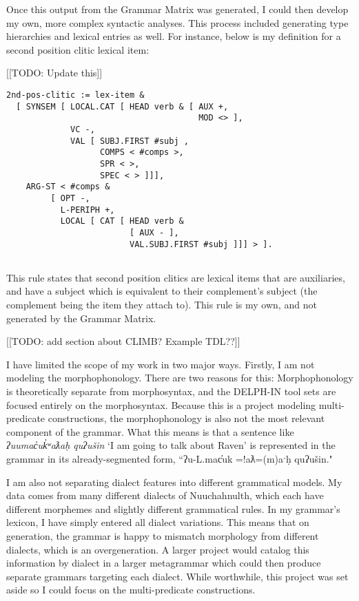 Once this output from the Grammar Matrix was generated, I could then develop my own, more complex syntactic analyses. This process included generating type hierarchies and lexical entries as well. For instance, below is my definition for a second position clitic lexical item:

[[TODO: Update this]]

\begin{verbatim}
2nd-pos-clitic := lex-item &
  [ SYNSEM [ LOCAL.CAT [ HEAD verb & [ AUX +,
				                       MOD <> ],
             VC -,
             VAL [ SUBJ.FIRST #subj ,
                   COMPS < #comps >,
                   SPR < >,
                   SPEC < > ]]],
    ARG-ST < #comps &
         [ OPT -,
           L-PERIPH +,
           LOCAL [ CAT [ HEAD verb &
                         [ AUX - ],
                         VAL.SUBJ.FIRST #subj ]]] > ].
	
\end{verbatim}

\noindent This rule states that second position clitics are lexical items that are auxiliaries, and have a subject which is equivalent to their complement's subject (the complement being the item they attach to). This rule is my own, and not generated by the Grammar Matrix.

[[TODO: add section about CLIMB? Example TDL??]]

I have limited the scope of my work in two major ways. Firstly, I am not modeling the morphophonology. There are two reasons for this: Morphophonology is theoretically separate from morphosyntax, and the DELPH-IN tool sets are focused entirely on the morphosyntax. Because this is a project modeling multi-predicate constructions, the morphophonology is also not the most relevant component of the grammar. What this means is that a sentence like \textit{ʔuumac̓uk̓ʷaƛaḥ quʔušin} `I am going to talk about Raven' is represented in the grammar in its already-segmented form, ``ʔu-L.mac̓uk =!aƛ=(m)aˑḥ quʔušin."

I am also not separating dialect features into different grammatical models. My data comes from many different dialects of Nuuchahnulth, which each have different morphemes and slightly different grammatical rules. In my grammar's lexicon, I have simply entered all dialect variations. This means that on generation, the grammar is happy to mismatch morphology from different dialects, which is an overgeneration. A larger project would catalog this information by dialect in a larger metagrammar which could then produce separate grammars targeting each dialect. While worthwhile, this project was set aside so I could focus on the multi-predicate constructions.

